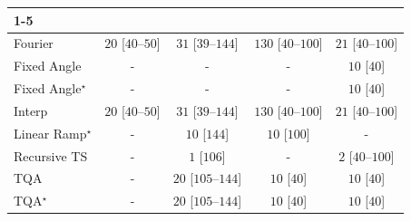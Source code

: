 \begin{tabular}{l|cccc|}
\cline{1-5}
\multicolumn{5}{c}{\rule{0pt}{8pt}PP} \\
\midrule
Fourier & {\cellcolor[HTML]{F4FBF1}} \color[HTML]{000000} $20$ [$40$--$50$] & {\cellcolor[HTML]{F1FAEE}} \color[HTML]{000000} $31$ [$39$--$144$] & {\cellcolor[HTML]{D7EFD1}} \color[HTML]{000000} $130$ [$40$--$100$] & {\cellcolor[HTML]{F3FAF0}} \color[HTML]{000000} $21$ [$40$--$100$] \\
Fixed Angle & {\cellcolor[HTML]{000000}} \color[HTML]{F1F1F1} {\cellcolor{white}} \color{black} - & {\cellcolor[HTML]{000000}} \color[HTML]{F1F1F1} {\cellcolor{white}} \color{black} - & {\cellcolor[HTML]{000000}} \color[HTML]{F1F1F1} {\cellcolor{white}} \color{black} - & {\cellcolor[HTML]{F5FBF3}} \color[HTML]{000000} $10$ [$40$] \\
Fixed Angle$^\star$ & {\cellcolor[HTML]{000000}} \color[HTML]{F1F1F1} {\cellcolor{white}} \color{black} - & {\cellcolor[HTML]{000000}} \color[HTML]{F1F1F1} {\cellcolor{white}} \color{black} - & {\cellcolor[HTML]{000000}} \color[HTML]{F1F1F1} {\cellcolor{white}} \color{black} - & {\cellcolor[HTML]{F5FBF3}} \color[HTML]{000000} $10$ [$40$] \\
Interp & {\cellcolor[HTML]{F4FBF1}} \color[HTML]{000000} $20$ [$40$--$50$] & {\cellcolor[HTML]{F1FAEE}} \color[HTML]{000000} $31$ [$39$--$144$] & {\cellcolor[HTML]{D7EFD1}} \color[HTML]{000000} $130$ [$40$--$100$] & {\cellcolor[HTML]{F3FAF0}} \color[HTML]{000000} $21$ [$40$--$100$] \\
Linear Ramp$^\star$ & {\cellcolor[HTML]{000000}} \color[HTML]{F1F1F1} {\cellcolor{white}} \color{black} - & {\cellcolor[HTML]{F5FBF3}} \color[HTML]{000000} $10$ [$144$] & {\cellcolor[HTML]{F5FBF3}} \color[HTML]{000000} $10$ [$100$] & {\cellcolor[HTML]{000000}} \color[HTML]{F1F1F1} {\cellcolor{white}} \color{black} - \\
Recursive TS & {\cellcolor[HTML]{000000}} \color[HTML]{F1F1F1} {\cellcolor{white}} \color{black} - & {\cellcolor[HTML]{F7FCF5}} \color[HTML]{000000} $1$ [$106$] & {\cellcolor[HTML]{000000}} \color[HTML]{F1F1F1} {\cellcolor{white}} \color{black} - & {\cellcolor[HTML]{F7FCF5}} \color[HTML]{000000} $2$ [$40$--$100$] \\
TQA & {\cellcolor[HTML]{000000}} \color[HTML]{F1F1F1} {\cellcolor{white}} \color{black} - & {\cellcolor[HTML]{F4FBF1}} \color[HTML]{000000} $20$ [$105$--$144$] & {\cellcolor[HTML]{F5FBF3}} \color[HTML]{000000} $10$ [$40$] & {\cellcolor[HTML]{F5FBF3}} \color[HTML]{000000} $10$ [$40$] \\
TQA$^\star$ & {\cellcolor[HTML]{000000}} \color[HTML]{F1F1F1} {\cellcolor{white}} \color{black} - & {\cellcolor[HTML]{F4FBF1}} \color[HTML]{000000} $20$ [$105$--$144$] & {\cellcolor[HTML]{F5FBF3}} \color[HTML]{000000} $10$ [$40$] & {\cellcolor[HTML]{F5FBF3}} \color[HTML]{000000} $10$ [$40$] \\

\end{tabular}
